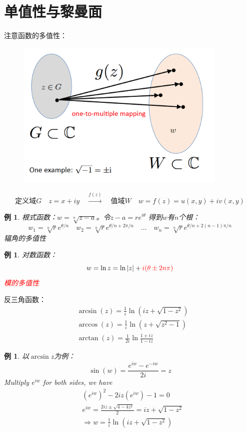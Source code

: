\documentclass[10pt, a4paper, oneside]{ctexbook}
\newtheorem{example}[theorem]{例}
\begin{document}
\section{单值性与黎曼面}
注意函数的多值性：
\begin{figure}[h]
    \includegraphics[width=0.9\textwidth]{./assets/multi-value.png}
\end{figure}
\begin{equation*}
    \text{定义域$G$}\quad z=x+i y \quad \xrightarrow{f(z)} \quad \text{值域$W$} \quad w=f(z)=u(x, y)+i v(x, y)
\end{equation*}
\begin{example}
    根式函数：$w=\sqrt[n]{z-a}$。令$z-a=re^{i\theta}$
    得到$w$有$n$个根：
    $$
        w_1=\sqrt[n]{r}e^{\theta/n}\quad
        w_2=\sqrt[n]{r}e^{\theta/n+2\pi/n}\quad
        \dots \quad
        w_n=\sqrt[n]{r}e^{\theta/n+2(n-1)\pi/n}
    $$
    辐角的多值性
\end{example}
\begin{example}
    对数函数：
    $$
        w=\ln z=\ln |z| +\textcolor{red}{i(\theta \pm 2n\pi)}
    $$
    \textcolor{red}{模的多值性}
\end{example}
反三角函数：
\begin{align*}
     & \arcsin (z)=\frac{1}{i} \ln \left(i z+\sqrt{1-z^{2}}\right) \\
     & \arccos (z)=\frac{1}{i} \ln \left(z+\sqrt{z^{2}-1}\right)   \\
     & \arctan (z)=\frac{1}{2 i} \ln \frac{1+i z}{1-i z}
\end{align*}
\begin{example}
    以$\arcsin z$为例：
    $$
        \sin (w)=\frac{e^{i w}-e^{-i w}}{2 i}=z
    $$
    {\rm Multiply $e^{i w}$ for both sides, we have}
    $$
        \begin{aligned}
             & \left(e^{i w}\right)^{2}-2 i z\left(e^{i w}\right)-1=0          \\
             & e^{i w}=\frac{2 i z \pm \sqrt{4-4 z^{2}}}{2}=i z+\sqrt{1-z^{2}} \\
             & \Rightarrow w=\frac{1}{i} \ln \left(i z+\sqrt{1-z^{2}}\right)
        \end{aligned}
    $$
\end{example}
\end{document}
